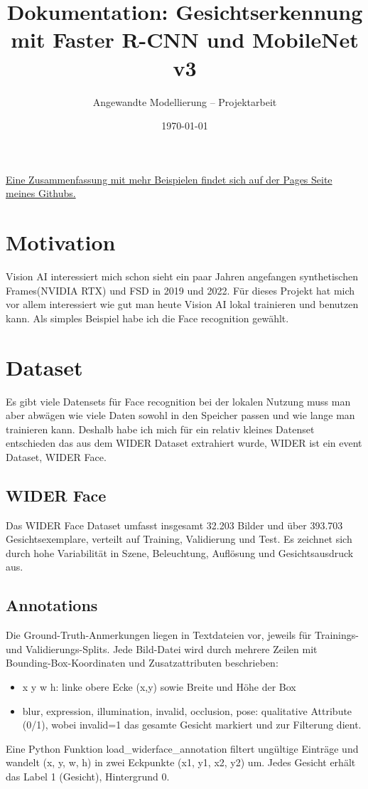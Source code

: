 \documentclass[11pt,a4paper]{article}
\title{\textbf{Dokumentation: Gesichtserkennung mit Faster R-CNN und MobileNet v3}}
\author{Angewandte Modellierung – Projektarbeit}
\date{\today}
\begin{document}
\maketitle
\color{darkpurp}
\href{https://7hands.github.io/Angewandte-Modellierung-25-Colmant/}{Eine Zusammenfassung mit mehr Beispielen findet sich auf der Pages Seite meines Githubs.}
\color{black}
\tableofcontents
\newpage



\section{Motivation}
Vision AI interessiert mich schon sieht ein paar Jahren angefangen synthetischen Frames(NVIDIA RTX) und FSD in 2019 und 2022. Für dieses Projekt hat mich vor allem interessiert wie gut man heute Vision AI lokal trainieren und benutzen kann. Als simples Beispiel habe ich die Face recognition gewählt.

\section{Dataset}
Es gibt viele Datensets für Face recognition bei der lokalen Nutzung muss man aber abwägen wie viele Daten sowohl in den Speicher passen und wie lange man trainieren kann. Deshalb habe ich mich für ein relativ kleines Datenset entschieden das aus dem WIDER Dataset extrahiert wurde, WIDER ist ein event Dataset, WIDER Face.

\subsection{WIDER Face}
Das WIDER Face Dataset umfasst insgesamt 32.203 Bilder und über 393.703 Gesichtsexemplare, verteilt auf Training, Validierung und Test. Es zeichnet sich durch hohe Variabilität in Szene, Beleuchtung, Auflösung und Gesichtsausdruck aus.

\subsection{Annotations}
Die Ground-Truth-Anmerkungen liegen in Textdateien vor, jeweils für Trainings- und Validierungs-Splits. Jede Bild-Datei wird durch mehrere Zeilen mit Bounding-Box-Koordinaten und Zusatzattributen beschrieben:
\begin{itemize}
\item x y w h: linke obere Ecke (x,y) sowie Breite und Höhe der Box
\item blur, expression, illumination, invalid, occlusion, pose: qualitative Attribute (0/1), wobei invalid=1 das gesamte Gesicht markiert und zur Filterung dient.
\end{itemize}
Eine Python Funktion load\_widerface\_annotation filtert ungültige Einträge und wandelt (x, y, w, h) in zwei Eckpunkte (x1, y1, x2, y2) um. Jedes Gesicht erhält das Label 1 (Gesicht), Hintergrund 0.
\end{document}
